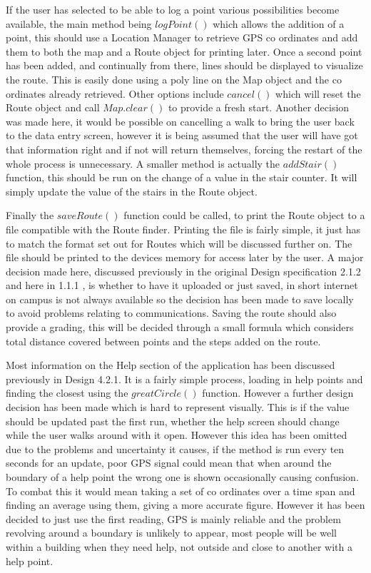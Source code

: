 If the user has selected to be able to log a point various possibilities become available, the main method being $logPoint()$ which allows the addition of a point, this should use a Location Manager to retrieve GPS co ordinates and add them to both the map and a Route object for printing later. Once a second point has been added, and continually from there, lines should be displayed to visualize the route. This is easily done using a poly line on the Map object and the co ordinates already retrieved. Other options include $cancel()$ which will reset the Route object and call $Map.clear()$ to provide a fresh start. Another decision was made here, it would be possible on cancelling a walk to bring the user back to the data entry screen, however it is being assumed that the user will have got that information right and if not will return themselves, forcing the restart of the whole process is unnecessary. A smaller method is actually the $addStair()$ function, this should be run on the change of a value in the stair counter. It will simply update the value of the stairs in the Route object. 

Finally the $saveRoute()$ function could be called, to print the Route object to a file compatible with the Route finder. Printing the file is fairly simple, it just has to match the format set out for Routes which will be discussed further on. The file should be printed to the devices memory\cite{storage} for access later by the user. A major decision made here, discussed previously in the original Design specification 2.1.2 and here in 1.1.1 , is whether to have it uploaded or just saved, in short internet on campus is not always available so the decision has been made to save locally to avoid problems relating to communications. Saving the route should also provide a grading, this will be decided through a small formula which considers total distance covered between points and the steps added on the route. 

Most information on the Help section of the application has been discussed previously in Design 4.2.1. It is a fairly simple process, loading in help points and finding the closest using the $greatCircle()$\cite{circle} function. However a further design decision has been made which is hard to represent visually. This is if the value should be updated past the first run, whether the help screen should change while the user walks around with it open. However this idea has been omitted due to the problems and uncertainty it causes, if the method is run every ten seconds for an update, poor GPS signal could mean that when around the boundary of a help point the wrong one is shown occasionally causing confusion. To combat this it would mean taking a set of co ordinates over a time span and finding an average using them, giving a more accurate figure. However it has been decided to just use the first reading, GPS is mainly reliable\cite{accuracy} and the problem revolving around a boundary is unlikely to appear, most people will be well within a building when they need help, not outside and close to another with a help point. 

